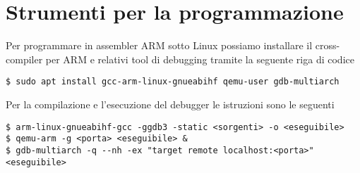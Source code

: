 \section{Strumenti per la programmazione}
Per programmare in assembler ARM sotto Linux possiamo installare il cross-compiler per ARM e
relativi tool di debugging tramite la seguente riga di codice
\begin{verbatim}
$ sudo apt install gcc-arm-linux-gnueabihf qemu-user gdb-multiarch
\end{verbatim}
Per la compilazione e l'esecuzione del debugger le istruzioni sono le seguenti
\begin{verbatim}
$ arm-linux-gnueabihf-gcc -ggdb3 -static <sorgenti> -o <eseguibile>
$ qemu-arm -g <porta> <eseguibile> &
$ gdb-multiarch -q --nh -ex "target remote localhost:<porta>" <eseguibile>
\end{verbatim}
